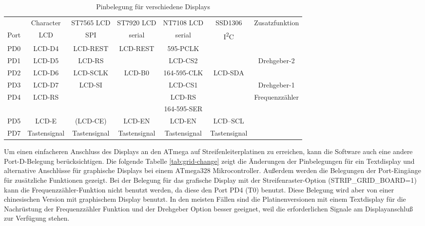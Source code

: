 \begin{table}[H] \small
  \begin{center}
    \begin{tabular}{| c || c | c | c | c | c | c |}
    \hline
           & Character     & ST7565 LCD & ST7920 LCD     & NT7108 LCD  & SSD1306     & Zusatzfunktion \\
      Port & LCD           &   SPI      & serial         & serial      &   I\textsuperscript{2}C      & \\
    \hline
    \hline
    PD0    &  LCD-D4       &  LCD-REST  & LCD-REST       & 595-PCLK        &            & \\
    \hline
    PD1    &  LCD-D5       &  LCD-RS    &                & LCD-CS2     &             & Drehgeber-2 \\
    \hline
    PD2    &  LCD-D6       &  LCD-SCLK  & LCD-B0         & 164-595-CLK &  LCD-SDA    & \\
    \hline
    PD3    &  LCD-D7       &  LCD-SI    &                & LCD-CS1     &             & Drehgeber-1 \\
    \hline
    PD4    &  LCD-RS       &            &                & LCD-RS      &             & Frequenzzähler \\
           &               &            &                & 164-595-SER &             &                \\
    \hline
    PD5    &  LCD-E        &  (LCD-CE)  & LCD-EN         & LCD-EN      &   LCD--SCL  & \\
    \hline
    PD7    & Tastensignal & Tastensignal & Tastensignal  & Tastensignal & Tastensignal & \\
    \hline
    \end{tabular}
  \end{center}
  \caption{Pinbelegung für verschiedene Displays}
  \label{tab:display-con}
\end{table}

Um einen einfacheren Anschluss des Displays an den ATmega auf Streifenleiterplatinen zu erreichen,
kann die Software auch eine andere Port-D-Belegung berücksichtigen.
Die folgende Tabelle \ref{tab:grid-change} zeigt die Änderungen der Pinbelegungen für ein Textdisplay und 
alternative Anschlüsse für graphische Displays bei einem ATmega328 Mikrocontroller.
Außerdem werden die Belegungen der Port-Eingänge für zusätzliche Funktionen gezeigt. 
Bei der Belegung für das grafische Display mit der Streifenraster-Option (STRIP\_GRID\_BOARD=1)
kann die Frequenzzähler-Funktion nicht benutzt werden, da diese den Port PD4 (T0) benutzt.
Diese Belegung wird aber von einer chinesischen Version mit graphischem Display benutzt.
In den meisten Fällen sind die Platinenversionen mit einem Textdisplay für die Nachrüstung der
Frequenzzähler Funktion und der Drehgeber Option besser geeignet, weil die erforderlichen
Signale am Displayanschluß zur Verfügung stehen. 


